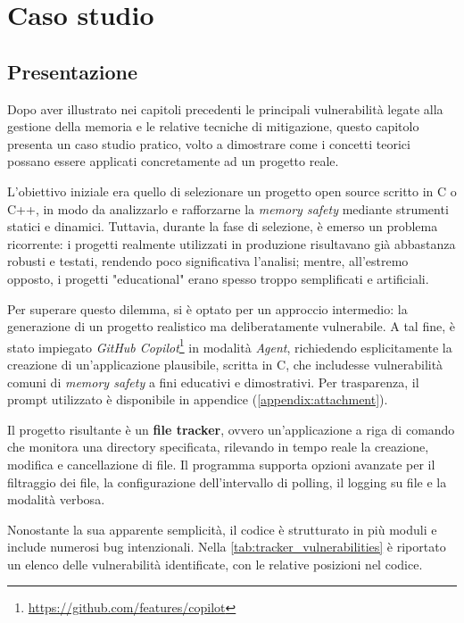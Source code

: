\chapter{Caso studio}
\label{chap:real_case}

\section{Presentazione}
\label{sec:presentation}

Dopo aver illustrato nei capitoli precedenti le principali vulnerabilità legate alla
gestione della memoria e le relative tecniche di mitigazione, questo capitolo
presenta un caso studio pratico, volto a dimostrare come i concetti teorici possano
essere applicati concretamente ad un progetto reale.

L'obiettivo iniziale era quello di selezionare un progetto open source scritto in
C o C++, in modo da analizzarlo e rafforzarne la \textit{memory safety} mediante
strumenti statici e dinamici. Tuttavia, durante la fase di selezione, è emerso
un problema ricorrente: i progetti realmente utilizzati in produzione risultavano
già abbastanza robusti e testati, rendendo poco significativa l'analisi; mentre,
all'estremo opposto, i progetti "educational" erano spesso troppo semplificati e
artificiali.

Per superare questo dilemma, si è optato per un approccio intermedio: la generazione
di un progetto realistico ma deliberatamente vulnerabile. A tal fine, è stato impiegato
\textit{GitHub Copilot}\footnote{\url{https://github.com/features/copilot}} in modalità
\textit{Agent}, richiedendo esplicitamente la creazione di un'applicazione plausibile,
scritta in C, che includesse vulnerabilità comuni di \textit{memory safety} a
fini educativi e dimostrativi. Per trasparenza, il prompt utilizzato è
disponibile in appendice (\autoref{appendix:attachment}).

Il progetto risultante è un \textbf{file tracker}, ovvero un'applicazione a riga
di comando che monitora una directory specificata, rilevando in tempo reale la creazione,
modifica e cancellazione di file. Il programma supporta opzioni avanzate per il filtraggio
dei file, la configurazione dell'intervallo di polling, il logging su file e la modalità
verbosa.

Nonostante la sua apparente semplicità, il codice è strutturato in più moduli e
include numerosi bug intenzionali. Nella \autoref{tab:tracker_vulnerabilities} è
riportato un elenco delle vulnerabilità identificate, con le relative posizioni
nel codice.

